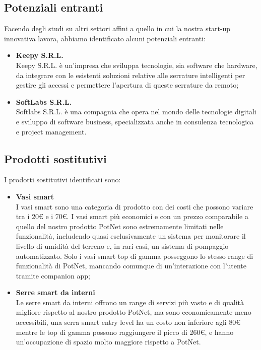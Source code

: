 \subsection{Potenziali entranti}

Facendo degli studi su altri settori affini a quello in cui la nostra start-up innovativa lavora, abbiamo identificato alcuni potenziali entranti:
\begin{itemize}
	\item \textbf{Keepy S.R.L.}\\
	Keepy S.R.L. è un’impresa che sviluppa tecnologie, sia software che hardware, da integrare con le esistenti soluzioni relative alle serrature intelligenti per gestire gli accessi e permettere l’apertura di queste serrature da remoto;
	\item \textbf{SoftLabs S.R.L.}\\
	Softlabs S.R.L. è una compagnia che opera nel mondo delle tecnologie digitali e sviluppo di software business, specializzata anche in consulenza tecnologica e project management. 
\end{itemize}

\subsection{Prodotti sostitutivi}
I prodotti sostitutivi identificati sono:
\begin{itemize}
	\item \textbf{Vasi smart}\\
	I vasi smart sono una categoria di prodotto con dei costi che possono variare tra i 20€ e i 70€. I vasi smart più economici e con un prezzo comparabile a quello del nostro prodotto PotNet sono estremamente limitati nelle funzionalità, includendo quasi esclusivamente un sistema per monitorare il livello di umidità del terreno e, in rari casi, un sistema di pompaggio automatizzato. Solo i vasi smart top di gamma posseggono lo stesso range di funzionalità di PotNet, mancando comunque di un’interazione con l’utente tramite companion app;
	\item \textbf{Serre smart da interni}\\
	Le serre smart da interni offrono un range di servizi più vasto e di qualità migliore rispetto al nostro prodotto PotNet, ma sono economicamente meno accessibili, una serra smart entry level ha un costo non inferiore agli 80€ mentre le top di gamma possono raggiungere il picco di 260€, e hanno un’occupazione di spazio molto maggiore rispetto a PotNet.
\end{itemize}

